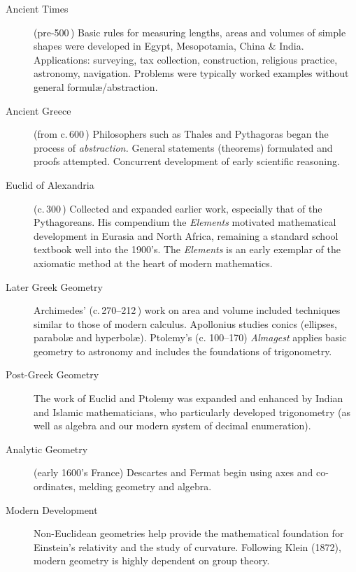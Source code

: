 \begin{description}
	\item[Ancient Times] (pre-500\,\BC) Basic rules for measuring lengths, areas and volumes of simple shapes were developed in Egypt, Mesopotamia, China \& India. Applications: surveying, tax collection, construction, religious practice, astronomy, navigation. Problems were typically worked examples without general formulæ/abstraction.
	
	\item[Ancient Greece] (from c.\,600\,\BC) Philosophers such as Thales and Pythagoras began the process of \emph{abstraction.} General statements (theorems) formulated and proofs attempted. Concurrent development of early scientific reasoning.
	
	\item[Euclid of Alexandria] (c.\,300\,\BC) Collected and expanded earlier work, especially that of the Pytha\-goreans. His compendium the \emph{Elements} motivated mathematical development in Eurasia and North Africa, remaining a standard school textbook well into the 1900's. The \emph{Elements} is an early exemplar of the axiomatic method at the heart of modern mathematics.
	
	\item[Later Greek Geometry] Archimedes' (c.\,270--212\,\BC) work on area and volume included techniques similar to those of modern calculus. Apollonius studies conics (ellipses, parabolæ and hyperbolæ).
	Ptolemy's (c.\,\AD\,100--170) \emph{Almagest} applies basic geometry to astronomy and includes the foundations of trigonometry.
	
	\item[Post-Greek Geometry] The work of Euclid and Ptolemy was expanded and enhanced by Indian and Islamic mathematicians, who particularly developed trigonometry (as well as algebra and our modern system of decimal enumeration).
	
	\item[Analytic Geometry] (early 1600's France) Descartes and Fermat begin using axes and co-ordinates, melding geometry and algebra.
 	
	\item[Modern Development] Non-Euclidean geometries help provide the mathematical foundation for Einstein's relativity and the study of curvature. Following Klein (1872), modern geometry is highly dependent on group theory.
\end{description}



